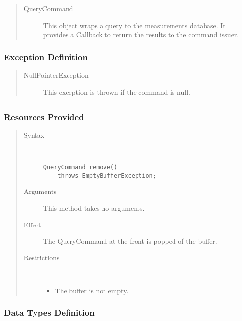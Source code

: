 \begin{quote}
	\begin{description}
		\item[QueryCommand] This object wraps a query to the measurements database. It
		provides a Callback to return the results to the command issuer.
	\end{description} 
\end{quote}

\subsubsection{Exception Definition}

\begin{quote}
	\begin{description}
		\item[NullPointerException] This exception is thrown if the command is null.
	\end{description} 
\end{quote}

\subsection{}

\subsubsection{Resources Provided}

\begin{quote}
	\begin{description}
		\item[Syntax] \ 
		\begin{verbatim}
QueryCommand remove() 
    throws EmptyBufferException;
		\end{verbatim}
		\item[Arguments] This method takes no arguments.
		\item[Effect] The QueryCommand at the front is popped of the buffer.
		\item[Restrictions] \ 
		\begin{itemize}
			\item The buffer is not empty. 
		\end{itemize}
	\end{description} 
\end{quote}

\subsubsection{Data Types Definition}

